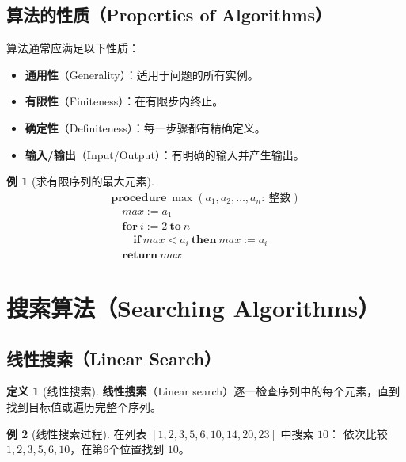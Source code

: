 \documentclass[UTF8,11pt,a4paper]{ctexbook}   %
\theoremstyle{definition}
\newtheorem{definition}{定义}[section]
\newtheorem{example}{例}[section]
\begin{document}
\subsection{算法的性质（Properties of Algorithms）}

算法通常应满足以下性质：

\begin{itemize}
    \item \textbf{通用性}（Generality）：适用于问题的所有实例。
    \item \textbf{有限性}（Finiteness）：在有限步内终止。
    \item \textbf{确定性}（Definiteness）：每一步骤都有精确定义。
    \item \textbf{输入/输出}（Input/Output）：有明确的输入并产生输出。
\end{itemize}

\begin{example}[求有限序列的最大元素]
\[
\begin{array}{l}
\textbf{procedure}\ \max(a_1, a_2, \ldots, a_n:\ \text{整数})\\
\quad max := a_1\\
\quad \textbf{for}\ i := 2\ \textbf{to}\ n\\
\quad \quad \textbf{if}\ max < a_i\ \textbf{then}\ max := a_i\\
\quad \textbf{return}\ max
\end{array}
\]
\end{example}

\section{搜索算法（Searching Algorithms）}

\subsection{线性搜索（Linear Search）}

\begin{definition}[线性搜索]
\textbf{线性搜索}（Linear search）逐一检查序列中的每个元素，直到找到目标值或遍历完整个序列。
\end{definition}

\begin{example}[线性搜索过程]
在列表 $[1,2,3,5,6,10,14,20,23]$ 中搜索 $10$：
依次比较 $1,2,3,5,6,10$，在第6个位置找到 $10$。
\end{example}
\end{document}

